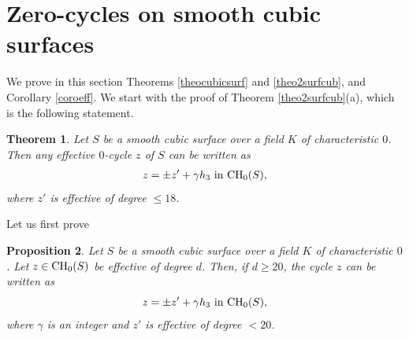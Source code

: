 \documentclass[10pt]{article}
\newtheorem{theo}{Theorem}[section]
\newtheorem{prop}[theo]{Proposition}
\begin{document}
\section{Zero-cycles on smooth cubic surfaces \label{seccubsurf}}
We prove in this section Theorems \ref{theocubicsurf} and \ref{theo2surfcub}, and Corollary \ref{coroeff}. We start with the proof of  Theorem \ref{theo2surfcub}(a), which is  the following statement.
\begin{theo} \label{theo2surfcubcasgen} Let $S$ be a  smooth cubic surface over  a field $K$ of characteristic $0$. Then any  effective $0$-cycle $z$ of $S$ can be written as
 \begin{eqnarray}\label{eqformcycle} z=\pm z'+\gamma h_3\,\,{\rm in}\,\,{\rm CH}_0(S),\end{eqnarray}
 where $z'$ is effective of degree $\leq 18$.
\end{theo}
 Let us first prove
\begin{prop}\label{prodescent} Let $S$ be a smooth  cubic surface over a field $K$ of characteristic $0$. Let $z\in{\rm CH}_0(S)$ be effective  of degree $d$. Then, if $d\geq 20$, the cycle
$z$ can be written as
$$z=\pm  z'+\gamma h_3\,\,{\rm in}\,\,{\rm CH}_0(S),$$ where  $\gamma$ is an integer and $z'$ is effective of degree $<20$.\end{prop}
\end{document}
